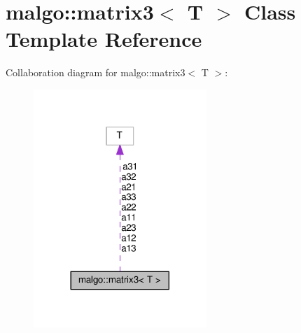 \hypertarget{classmalgo_1_1matrix3}{}\section{malgo\+:\+:matrix3$<$ T $>$ Class Template Reference}
\label{classmalgo_1_1matrix3}


Collaboration diagram for malgo\+:\+:matrix3$<$ T $>$\+:
\nopagebreak
\begin{figure}[H]
\begin{center}
\leavevmode
\includegraphics[width=185pt]{classmalgo_1_1matrix3__coll__graph}
\end{center}
\end{figure}
